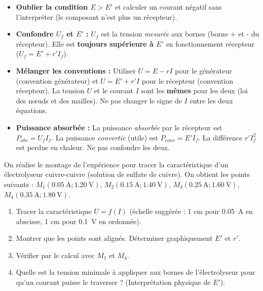 \documentclass[11pt]{article}
\begin{document}
\begin{attention}
\begin{itemize}
\item \textbf{Oublier la condition $E > E'$} et calculer un courant négatif sans l'interpréter (le composant n'est plus un récepteur).
\item \textbf{Confondre $U_f$ et $E'$ :} $U_f$ est la tension \emph{mesurée} aux bornes (borne + et - du récepteur). Elle est \textbf{toujours supérieure à $E'$} en fonctionnement récepteur ($U_f = E' + r'I_f$).
\item \textbf{Mélanger les conventions :} Utiliser $U = E - rI$ pour le générateur (convention générateur) et $U = E' + r'I$ pour le récepteur (convention récepteur). La tension $U$ et le courant $I$ sont les \textbf{mêmes} pour les deux (loi des nœuds et des mailles). Ne pas changer le signe de $I$ entre les deux équations.
\item \textbf{Puissance absorbée :} La puissance \emph{absorbée} par le récepteur est $P_{abs} = U_f I_f$. La puissance \emph{convertie} (utile) est $P_{conv} = E' I_f$. La différence $r' I_f^2$ est perdue en chaleur. Ne pas confondre les deux.
\end{itemize}
\end{attention}

\begin{exercice}
On réalise le montage de l'expérience pour tracer la caractéristique d'un électrolyseur cuivre-cuivre (solution de sulfate de cuivre). On obtient les points suivants :
$M_1(\SI{0,05}{\ampere} ; \SI{1,20}{\volt})$, $M_2(\SI{0,15}{\ampere} ; \SI{1,40}{\volt})$, $M_3(\SI{0,25}{\ampere} ; \SI{1,60}{\volt})$, $M_4(\SI{0,35}{\ampere} ; \SI{1,80}{\volt})$.
\begin{enumerate}
\item Tracer la caractéristique $U = f(I)$ (échelle suggérée : 1 cm pour \SI{0,05}{\ampere} en abscisse, 1 cm pour \SI{0,1}{\volt} en ordonnée).
\item Montrer que les points sont alignés. Déterminer graphiquement $E'$ et $r'$.
\item Vérifier par le calcul avec $M_1$ et $M_4$.
\item Quelle est la tension minimale à appliquer aux bornes de l'électrolyseur pour qu'un courant puisse le traverser ? (Interprétation physique de $E'$).
\end{enumerate}
\end{exercice}
\end{document}
